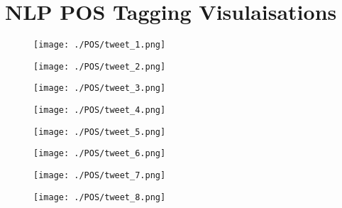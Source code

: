%

\chapter{NLP POS Tagging Visulaisations}
\label{app:POS_vis}

\begin{figure}[h]
	\centering
	\texttt{[image: ./POS/tweet\_1.png]}
	\caption{}
	
	
\end{figure} 
\begin{figure}[h]
	\centering
	\texttt{[image: ./POS/tweet\_2.png]}
	\caption{}
	
	
\end{figure} 

\begin{figure}[h]
	\centering
	\texttt{[image: ./POS/tweet\_3.png]}
	\caption{}
	
	
\end{figure} 

\begin{figure}[h]
	\centering
	\texttt{[image: ./POS/tweet\_4.png]}
	\caption{}
	
	
\end{figure} 
\begin{figure}[h]
	\centering
	\texttt{[image: ./POS/tweet\_5.png]}
	\caption{}
	
\end{figure} 

\begin{figure}[h]
	\centering
\texttt{[image: ./POS/tweet\_6.png]}
	\caption{}
	
\end{figure} 


\begin{figure}[h]
	\centering
	\texttt{[image: ./POS/tweet\_7.png]}
	\caption{}
	
\end{figure} 

\begin{figure}[h]
	\centering
	\texttt{[image: ./POS/tweet\_8.png]}
	\caption{}
	
\end{figure} 

